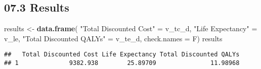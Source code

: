\documentclass[
]{article}
\newenvironment{Shaded}{\begin{snugshade}}{\end{snugshade}}
\newcommand{\CommentTok}[1]{\textcolor[rgb]{0.56,0.35,0.01}{\textit{#1}}}
\newcommand{\DataTypeTok}[1]{\textcolor[rgb]{0.13,0.29,0.53}{#1}}
\newcommand{\KeywordTok}[1]{\textcolor[rgb]{0.13,0.29,0.53}{\textbf{#1}}}
\newcommand{\NormalTok}[1]{#1}
\newcommand{\OperatorTok}[1]{\textcolor[rgb]{0.81,0.36,0.00}{\textbf{#1}}}
\newcommand{\StringTok}[1]{\textcolor[rgb]{0.31,0.60,0.02}{#1}}
\begin{document}
\begin{Shaded}
\end{Shaded}

\hypertarget{results}{%
\subsection{07.3 Results}\label{results}}

\begin{Shaded}
\begin{Highlighting}[]
\NormalTok{results <-}\StringTok{ }\KeywordTok{data.frame}\NormalTok{( }\StringTok{"Total Discounted Cost"}\NormalTok{ =}\StringTok{ }\NormalTok{v_tc_d, }
                       \StringTok{"Life Expectancy"}\NormalTok{ =}\StringTok{ }\NormalTok{v_le, }
                       \StringTok{"Total Discounted QALYs"}\NormalTok{ =}\StringTok{ }\NormalTok{v_te_d, }
                       \DataTypeTok{check.names =}\NormalTok{ F)}
\NormalTok{results}
\end{Highlighting}
\end{Shaded}

\begin{verbatim}
##   Total Discounted Cost Life Expectancy Total Discounted QALYs
## 1              9382.938        25.89709               11.98968
\end{verbatim}
\end{document}
